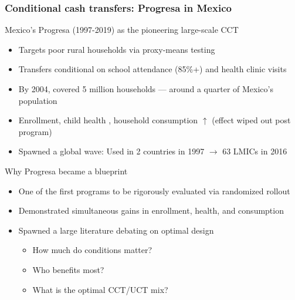 \documentclass[aspectratio=169]{beamer}
\begin{document}
\begin{frame}
\frametitle{Conditional cash transfers: Progresa in Mexico}
Mexico's Progresa (1997-2019) as the pioneering large-scale CCT
\begin{itemize}\setlength\itemsep{3pt}
\item Targets poor rural households via proxy-means testing
\item Transfers conditional on school attendance (85\%+) and health clinic visits
\item By 2004, covered 5 million households --- around a quarter of Mexico's population
\item Enrollment, child health , household consumption $\uparrow$ (effect wiped out post program)
\item Spawned a global wave: Used in 2 countries in 1997 $\to$ 63 LMICs in 2016

\end{itemize}\medskip
Why Progresa became a blueprint
\begin{itemize}\setlength\itemsep{3pt}
\item One of the first programs to be rigorously evaluated via randomized rollout
\item Demonstrated simultaneous gains in enrollment, health, and consumption
\item Spawned a large literature debating on optimal design
 \begin{itemize}\setlength\itemsep{3pt}
\item How much do conditions matter? 
\item Who benefits most? 
\item What is the optimal CCT/UCT mix?
\end{itemize}
\end{itemize}
\end{frame}
\end{document}
